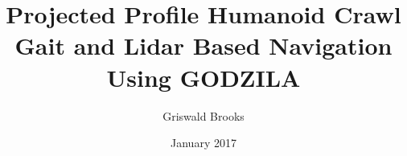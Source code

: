 
%


%


%
\graphicspath{{./pictures/}}


\renewcommand{\baselinestretch}{1.6}
\newtheorem{theorem}{Theorem}[chapter]
\newcommand{\btheorem}{\begin{theorem}\rm}
\newcommand{\etheorem}{$\diamond$\end{theorem}}
\newtheorem{definition}{Definition}[chapter]
\newcommand{\bdefn}{\begin{definition}\rm}
\newcommand{\edefn}{\end{definition}}
\newtheorem{lemma}{Lemma}[chapter]
\newtheorem{remark}{Remark}[chapter]
\newcommand{\bremark}{\begin{remark}\rm}
\newcommand{\eremark}{\end{remark}}
\newtheorem{example}{Example}[chapter]
\newcommand{\bexample}{\begin{example}\rm}
\newcommand{\eexample}{\end{example}}
\newtheorem{assumption}{Assumption}[chapter]
\newcommand{\bassump}{\begin{assumption}\rm}
\newcommand{\eassump}{\end{assumption}}


\title{Projected Profile Humanoid Crawl Gait and Lidar Based Navigation Using GODZILA}
\author{Griswald Brooks}
\date{January 2017}

\mstitlepage

